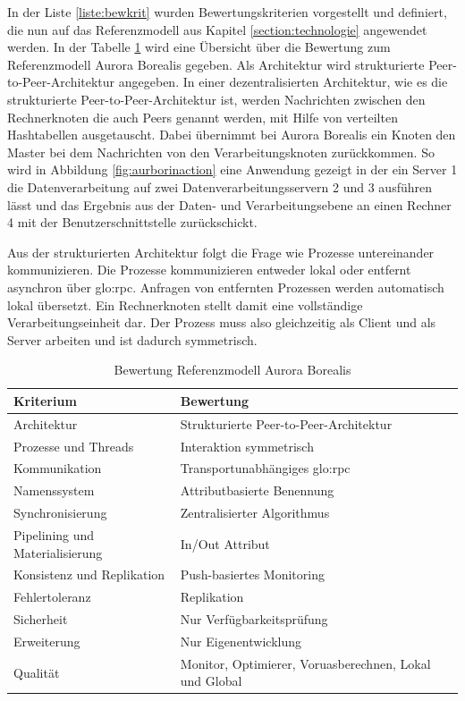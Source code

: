 In der Liste \ref{liste:bewkrit} wurden Bewertungskriterien vorgestellt und definiert, die nun auf das Referenzmodell aus Kapitel \ref{section:technologie} angewendet werden. In der Tabelle \ref{tab:bewrefaurbor} wird eine Übersicht über die Bewertung zum Referenzmodell Aurora Borealis gegeben. Als Architektur wird strukturierte Peer-to-Peer-Architektur angegeben. In einer dezentralisierten Architektur, wie es die strukturierte Peer-to-Peer-Architektur ist, werden Nachrichten zwischen den Rechnerknoten die auch Peers genannt werden, mit Hilfe von verteilten Hashtabellen ausgetauscht. Dabei übernimmt bei Aurora Borealis ein Knoten den Master bei dem Nachrichten von den Verarbeitungsknoten zurückkommen. So wird in Abbildung \ref{fig:aurborinaction} eine Anwendung gezeigt in der ein Server 1 die Datenverarbeitung auf zwei Datenverarbeitungsservern 2 und 3 ausführen lässt und das Ergebnis aus der Daten- und Verarbeitungsebene an einen Rechner 4 mit der Benutzerschnittstelle zurückschickt.  

Aus der strukturierten Architektur folgt die Frage wie Prozesse untereinander kommunizieren. Die Prozesse kommunizieren entweder lokal oder entfernt asynchron über \gls{glo:rpc}. Anfragen von entfernten Prozessen werden automatisch lokal übersetzt. Ein Rechnerknoten stellt damit eine vollständige Verarbeitungseinheit dar. Der Prozess muss also gleichzeitig als Client und als Server arbeiten und ist dadurch symmetrisch. 

\begin{table}[htbp]
	\centering
		\begin{tabular}{@{}ll@{}} \toprule
			\textbf{Kriterium} & \textbf{Bewertung} \\ \midrule
			Architektur & Strukturierte Peer-to-Peer-Architektur \\
			Prozesse und Threads & Interaktion symmetrisch \\ 
			Kommunikation &  Transportunabhängiges \gls{glo:rpc}\\
			Namenssystem &  Attributbasierte Benennung\\
			Synchronisierung &  Zentralisierter Algorithmus \\
			Pipelining und Materialisierung &  In/Out Attribut\\
			Konsistenz und Replikation & Push-basiertes Monitoring \\			
			Fehlertoleranz &  Replikation \\
			Sicherheit & Nur Verfügbarkeitsprüfung \\			
			Erweiterung & Nur Eigenentwicklung \\
			Qualität &  Monitor, Optimierer, Voruasberechnen, Lokal und Global\\
			\bottomrule			
		\end{tabular}
	\caption{Bewertung Referenzmodell Aurora Borealis}
	\label{tab:bewrefaurbor}
\end{table}

